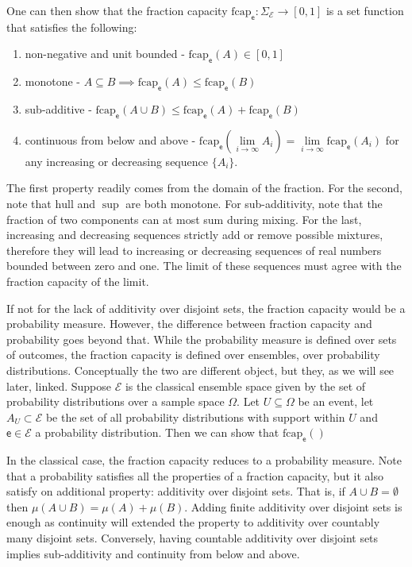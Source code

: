 \documentclass[10pt,twocolumn, nofootinbib]{revtex4-2}
\newcommand\hull{\mathrm{hull}}
\newcommand\frcap{\mathrm{fcap}}
\newcommand{\ens}[1][e] {\mathsf{#1}} %
\newcommand{\Ens}[1][E] {\mathcal{#1}} %
\begin{document}
One can then show that the fraction capacity $\frcap_{\ens} : \Sigma_{\Ens} \to [0,1]$ is a set function that satisfies the following:
\begin{enumerate}
	\item non-negative and unit bounded - $\frcap_{\ens}(A) \in [0,1]$
	\item monotone - $A \subseteq B \implies \frcap_{\ens}(A) \leq \frcap_{\ens}(B)$
	\item sub-additive - $\frcap_{\ens}(A \cup B) \leq \frcap_{\ens}(A) + \frcap_{\ens}(B)$
	\item continuous from below and above - $\frcap_{\ens}(\lim\limits_{i \to \infty} A_i) = \lim\limits_{i \to \infty} \frcap_{\ens}(A_i)$ for any increasing or decreasing sequence $\{A_i\}$.
\end{enumerate}

The first property readily comes from the domain of the fraction. For the second, note that $\hull$ and $\sup$ are both monotone. For sub-additivity, note that the fraction of two components can at most sum during mixing. For the last, increasing and decreasing sequences strictly add or remove possible mixtures, therefore they will lead to increasing or decreasing sequences of real numbers bounded between zero and one. The limit of these sequences must agree with the fraction capacity of the limit.

If not for the lack of additivity over disjoint sets, the fraction capacity would be a probability measure. However, the difference between fraction capacity and probability goes beyond that. While the probability measure is defined over sets of outcomes, the fraction capacity is defined over ensembles, over probability distributions. Conceptually the two are different object, but they, as we will see later, linked. Suppose $\Ens$ is the classical ensemble space given by the set of probability distributions over a sample space $\Omega$. Let $U \subseteq \Omega$ be an event, let $A_U \subset \Ens$ be the set of all probability distributions with support within $U$ and $\ens \in \Ens$ a probability distribution. Then we can show that $\frcap_{\ens}() $

In the classical case, the fraction capacity reduces to a probability measure. Note that a probability satisfies all the properties of a fraction capacity, but it also satisfy on additional property: additivity over disjoint sets. That is, if $A \cup B = \emptyset$ then $\mu(A \cup B) = \mu(A) + \mu(B)$. Adding finite additivity over disjoint sets is enough as continuity will extended the property to additivity over countably many disjoint sets. Conversely, having countable additivity over disjoint sets implies sub-additivity and continuity from below and above. 
\end{document}
